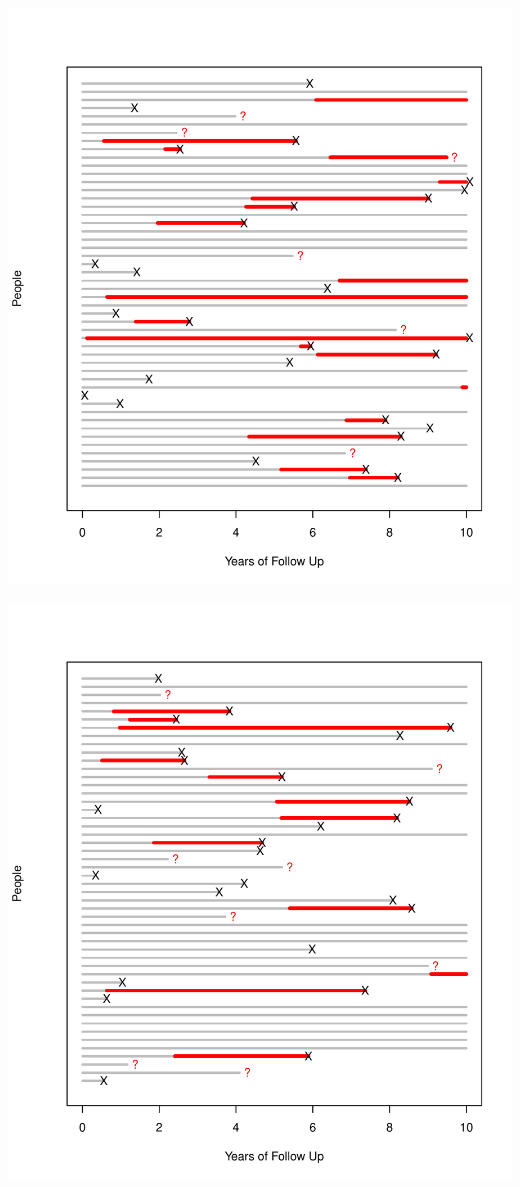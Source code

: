 \documentclass{article}
\begin{document}
\includegraphics{incidence-graphs-three}

\includegraphics{incidence-graphs-four}
\end{document}
